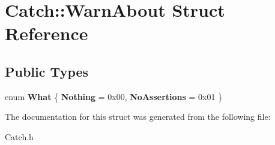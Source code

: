 \hypertarget{struct_catch_1_1_warn_about}{\section{Catch\-:\-:Warn\-About Struct Reference}
\label{struct_catch_1_1_warn_about}
}
\subsection*{Public Types}
\begin{DoxyCompactItemize}
\item 
enum {\bfseries What} \{ {\bfseries Nothing} = 0x00, 
{\bfseries No\-Assertions} = 0x01
 \}
\end{DoxyCompactItemize}


The documentation for this struct was generated from the following file\-:\begin{DoxyCompactItemize}
\item 
Catch.\-h\end{DoxyCompactItemize}
